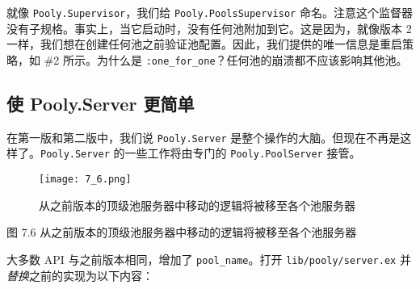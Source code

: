 就像 \texttt{Pooly.Supervisor}，我们给
\texttt{Pooly.PoolsSupervisor}
命名。注意这个监督器没有子规格。事实上，当它启动时，没有任何池附加到它。这是因为，就像版本
2
一样，我们想在创建任何池之前验证池配置。因此，我们提供的唯一信息是重启策略，如
\#2 所示。为什么是
\texttt{:one\_for\_one}？任何池的崩溃都不应该影响其他池。

\subsection{使 Pooly.Server 更简单}

在第一版和第二版中，我们说 \texttt{Pooly.Server}
是整个操作的大脑。但现在不再是这样了。\texttt{Pooly.Server}
的一些工作将由专门的 \texttt{Pooly.PoolServer} 接管。

\begin{figure}[!ht]
\centering
\texttt{[image: 7\_6.png]}
\caption{从之前版本的顶级池服务器中移动的逻辑将被移至各个池服务器}
\end{figure}

图 7.6 从之前版本的顶级池服务器中移动的逻辑将被移至各个池服务器

大多数 API 与之前版本相同，增加了
\texttt{pool\_name}。打开
\texttt{lib/pooly/server.ex}
并\emph{替换}之前的实现为以下内容：

